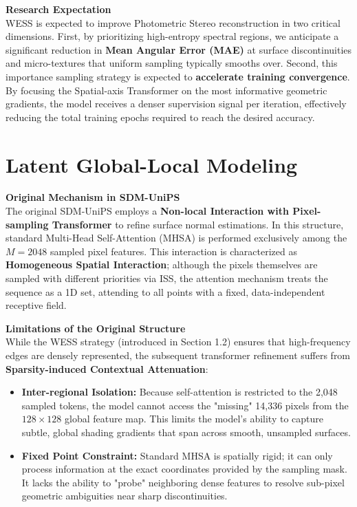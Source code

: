 \documentclass[Main.tex]{subfiles}
\begin{document}
\textbf{Research Expectation} \\
WESS is expected to improve Photometric Stereo reconstruction in two critical dimensions. First, by prioritizing high-entropy spectral regions, we anticipate a significant reduction in \textbf{Mean Angular Error (MAE)} at surface discontinuities and micro-textures that uniform sampling typically smooths over. Second, this importance sampling strategy is expected to \textbf{accelerate training convergence}. By focusing the Spatial-axis Transformer on the most informative geometric gradients, the model receives a denser supervision signal per iteration, effectively reducing the total training epochs required to reach the desired accuracy.

\section{Latent Global-Local Modeling}

\textbf{Original Mechanism in SDM-UniPS} \\
The original SDM-UniPS employs a \textbf{Non-local Interaction with Pixel-sampling Transformer} to refine surface normal estimations. In this structure, standard Multi-Head Self-Attention (MHSA) is performed exclusively among the $M=2048$ sampled pixel features. This interaction is characterized as \textbf{Homogeneous Spatial Interaction}; although the pixels themselves are sampled with different priorities via ISS, the attention mechanism treats the sequence as a 1D set, attending to all points with a fixed, data-independent receptive field.

\textbf{Limitations of the Original Structure} \\
While the WESS strategy (introduced in Section 1.2) ensures that high-frequency edges are densely represented, the subsequent transformer refinement suffers from \textbf{Sparsity-induced Contextual Attenuation}:
\begin{itemize}
    \item \textbf{Inter-regional Isolation:} Because self-attention is restricted to the 2,048 sampled tokens, the model cannot access the "missing" 14,336 pixels from the $128 \times 128$ global feature map. This limits the model's ability to capture subtle, global shading gradients that span across smooth, unsampled surfaces.
    \item \textbf{Fixed Point Constraint:} Standard MHSA is spatially rigid; it can only process information at the exact coordinates provided by the sampling mask. It lacks the ability to "probe" neighboring dense features to resolve sub-pixel geometric ambiguities near sharp discontinuities.
\end{itemize}
\end{document}
